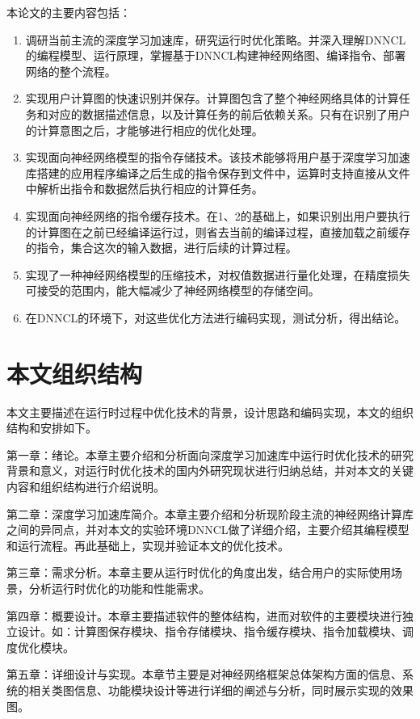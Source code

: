 本论文的主要内容包括：
\begin{enumerate}
  \item 调研当前主流的深度学习加速库，研究运行时优化策略。并深入理解DNNCL的编程模型、运行原理，掌握基于DNNCL构建神经网络图、编译指令、部署网络的整个流程。
  \item 实现用户计算图的快速识别并保存。计算图包含了整个神经网络具体的计算任务和对应的数据描述信息，以及计算任务的前后依赖关系。只有在识别了用户的计算意图之后，才能够进行相应的优化处理。
  \item 实现面向神经网络模型的指令存储技术。该技术能够将用户基于深度学习加速库搭建的应用程序编译之后生成的指令保存到文件中，运算时支持直接从文件中解析出指令和数据然后执行相应的计算任务。
  \item 实现面向神经网络的指令缓存技术。在1、2的基础上，如果识别出用户要执行的计算图在之前已经编译运行过，则省去当前的编译过程，直接加载之前缓存的指令，集合这次的输入数据，进行后续的计算过程。
  \item 实现了一种神经网络模型的压缩技术，对权值数据进行量化处理，在精度损失可接受的范围内，能大幅减少了神经网络模型的存储空间。
\item 在DNNCL的环境下，对这些优化方法进行编码实现，测试分析，得出结论。
\end{enumerate}

\section {本文组织结构}
本文主要描述在运行时过程中优化技术的背景，设计思路和编码实现，本文的组织结构和安排如下。

第一章：绪论。本章主要介绍和分析面向深度学习加速库中运行时优化技术的研究背景和意义，对运行时优化技术的国内外研究现状进行归纳总结，并对本文的关键内容和组织结构进行介绍说明。

第二章：深度学习加速库简介。本章主要介绍和分析现阶段主流的神经网络计算库之间的异同点，并对本文的实验环境DNNCL做了详细介绍，主要介绍其编程模型和运行流程。再此基础上，实现并验证本文的优化技术。

第三章：需求分析。本章主要从运行时优化的角度出发，结合用户的实际使用场景，分析运行时优化的功能和性能需求。

第四章：概要设计。本章主要描述软件的整体结构，进而对软件的主要模块进行独立设计。如：计算图保存模块、指令存储模块、指令缓存模块、指令加载模块、调度优化模块。

第五章：详细设计与实现。本章节主要是对神经网络框架总体架构方面的信息、系统的相关类图信息、功能模块设计等进行详细的阐述与分析，同时展示实现的效果图。

